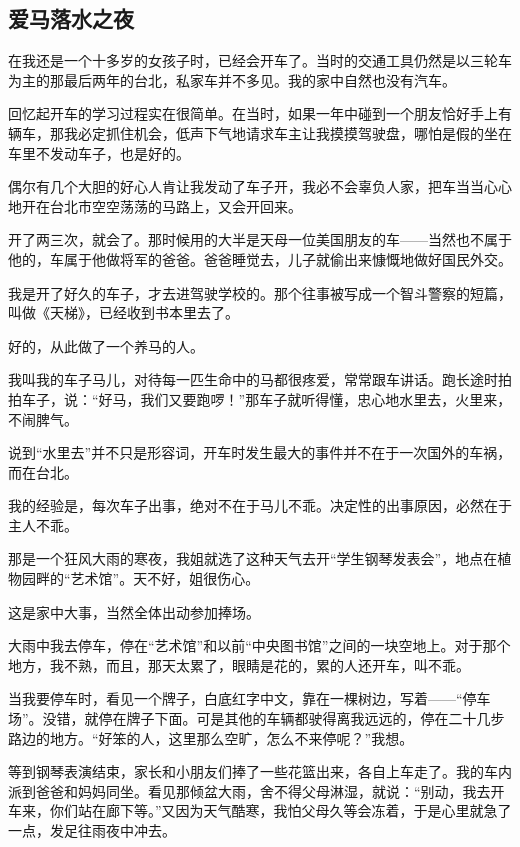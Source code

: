 \subsection{爱马落水之夜}


\par 在我还是一个十多岁的女孩子时，已经会开车了。当时的交通工具仍然是以三轮车为主的那最后两年的台北，私家车并不多见。我的家中自然也没有汽车。
\par 回忆起开车的学习过程实在很简单。在当时，如果一年中碰到一个朋友恰好手上有辆车，那我必定抓住机会，低声下气地请求车主让我摸摸驾驶盘，哪怕是假的坐在车里不发动车子，也是好的。
\par 偶尔有几个大胆的好心人肯让我发动了车子开，我必不会辜负人家，把车当当心心地开在台北市空空荡荡的马路上，又会开回来。
\par 开了两三次，就会了。那时候用的大半是天母一位美国朋友的车——当然也不属于他的，车属于他做将军的爸爸。爸爸睡觉去，儿子就偷出来慷慨地做好国民外交。
\par 我是开了好久的车子，才去进驾驶学校的。那个往事被写成一个智斗警察的短篇，叫做《天梯》，已经收到书本里去了。
\par 好的，从此做了一个养马的人。
\par 我叫我的车子马儿，对待每一匹生命中的马都很疼爱，常常跟车讲话。跑长途时拍拍车子，说：“好马，我们又要跑啰！”那车子就听得懂，忠心地水里去，火里来，不闹脾气。
\par 说到“水里去”并不只是形容词，开车时发生最大的事件并不在于一次国外的车祸，而在台北。
\par 我的经验是，每次车子出事，绝对不在于马儿不乖。决定性的出事原因，必然在于主人不乖。
\par 那是一个狂风大雨的寒夜，我姐就选了这种天气去开“学生钢琴发表会”，地点在植物园畔的“艺术馆”。天不好，姐很伤心。
\par 这是家中大事，当然全体出动参加捧场。
\par 大雨中我去停车，停在“艺术馆”和以前“中央图书馆”之间的一块空地上。对于那个地方，我不熟，而且，那天太累了，眼睛是花的，累的人还开车，叫不乖。
\par 当我要停车时，看见一个牌子，白底红字中文，靠在一棵树边，写着——“停车场”。没错，就停在牌子下面。可是其他的车辆都驶得离我远远的，停在二十几步路边的地方。“好笨的人，这里那么空旷，怎么不来停呢？”我想。
\par 等到钢琴表演结束，家长和小朋友们捧了一些花篮出来，各自上车走了。我的车内派到爸爸和妈妈同坐。看见那倾盆大雨，舍不得父母淋湿，就说：“别动，我去开车来，你们站在廊下等。”又因为天气酷寒，我怕父母久等会冻着，于是心里就急了一点，发足往雨夜中冲去。
